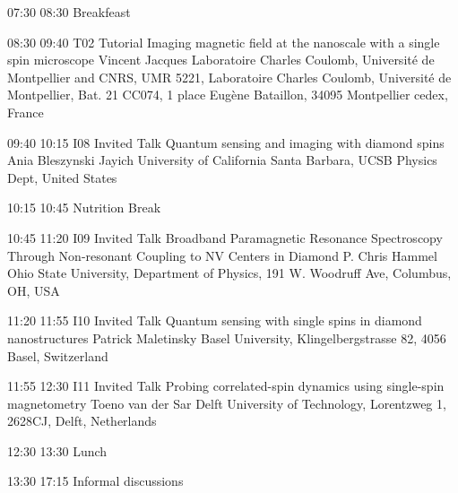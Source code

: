\begin{confbreak}
{07:30}
{08:30}
{Breakfeast}
\end{confbreak}

 

\begin{talk}
{08:30}
{09:40}
{T02}
{Tutorial}
{Imaging magnetic field at the nanoscale with a single spin microscope}
{Vincent Jacques}
{Laboratoire Charles Coulomb, Université de Montpellier and CNRS, UMR 5221, Laboratoire Charles Coulomb, Université de Montpellier, Bat. 21 CC074, 1 place Eugène Bataillon, 34095 Montpellier cedex, France}
\end{talk}

\begin{talk}
{09:40}
{10:15}
{I08}
{Invited Talk}
{Quantum sensing and imaging with diamond spins}
{Ania Bleszynski Jayich}
{University of California Santa Barbara, UCSB Physics Dept, United States}
\end{talk}

\begin{confbreak}
{10:15}
{10:45}
{Nutrition Break}
\end{confbreak}

\begin{talk}
{10:45}
{11:20}
{I09}
{Invited Talk}
{Broadband Paramagnetic Resonance Spectroscopy Through Non-resonant Coupling to NV Centers in Diamond}
{P. Chris Hammel}
{Ohio State University, Department of Physics, 191 W. Woodruff Ave, Columbus, OH, USA}
\end{talk}

\begin{talk}
{11:20}
{11:55}
{I10}
{Invited Talk}
{Quantum sensing with single spins in diamond nanostructures}
{Patrick Maletinsky}
{Basel University, Klingelbergstrasse 82, 4056 Basel, Switzerland}
\end{talk}

\begin{talk}
{11:55}
{12:30}
{I11}
{Invited Talk}
{Probing correlated-spin dynamics using single-spin magnetometry}
{Toeno van der Sar}
{Delft University of Technology, Lorentzweg 1, 2628CJ, Delft, Netherlands}
\end{talk}

\begin{confbreak}
{12:30}
{13:30}
{Lunch}
\end{confbreak}

\begin{confbreak}
{13:30}
{17:15}
{Informal discussions}
\end{confbreak}

